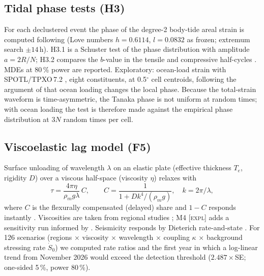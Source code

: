 \documentclass[11pt,a4paper]{article}
\newcommand{\expl}{\textnormal{\textsc{[expl]}}}
\begin{document}
\subsection{Tidal phase tests (H3)}
For each declustered event the phase of the degree-2 body-tide areal strain is computed following \textcite{tanaka2002} (Love numbers $h=0.6114$, $l=0.0832$ as frozen; extremum search $\pm14$\,h). H3.1 is a Schuster test of the phase distribution with amplitude $a=2R/N$; H3.2 compares the $b$-value in the tensile and compressive half-cycles \parencite[cf.][]{tan2019}. MDEs at 80\,\% power are reported. Exploratory: ocean-load strain with SPOTL/TPXO\,7.2 \parencite{agnew1997,egbert2002}, eight constituents, at 0.5$^\circ$ cell centroids, following the argument of \textcite{tsuruoka1995} that ocean loading changes the local phase. Because the total-strain waveform is time-asymmetric, the Tanaka phase is not uniform at random times; with ocean loading the test is therefore made against the empirical phase distribution at $3N$ random times per cell.

\subsection{Viscoelastic lag model (F5)}
Surface unloading of wavelength $\lambda$ on an elastic plate (effective thickness $T_e$, rigidity $D$) over a viscous half-space (viscosity $\eta$) relaxes with
\begin{equation}
\tau = \frac{4\pi\eta}{\rho_m g \lambda}\,C,\qquad C = \frac{1}{1 + D k^4/(\rho_m g)},\quad k=2\pi/\lambda,
\end{equation}
where $C$ is the flexurally compensated (delayed) share and $1-C$ responds instantly \parencite{turcotte2002}. Viscosities are taken from regional studies \parencite{larsen2004,larsen2005,lange2014,pagli2007,khan2016,barletta2018,mey2016}; M4 \expl{} adds a sensitivity run informed by \textcite{sasgen2026}. Seismicity responds by Dieterich rate-and-state \parencite{dieterich1994}. For 126 scenarios (regions $\times$ viscosity $\times$ wavelength $\times$ coupling $\kappa$ $\times$ background stressing rate $\dot S_0$) we computed rate ratios and the first year in which a log-linear trend from November 2026 would exceed the detection threshold ($2.487\times$SE; one-sided 5\,\%, power 80\,\%).
\end{document}

